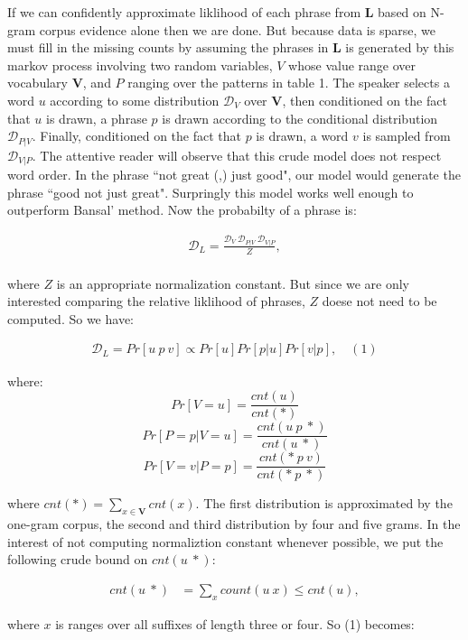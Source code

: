 If we can confidently approximate liklihood of each phrase from $\mathbf{L}$ based on N-gram corpus evidence alone then we are done. But because data is sparse, we must fill in the missing counts by assuming the phrases in $\mathbf{L}$ is generated by this markov process involving two random variables, $V$ whose value range over vocabulary $\mathbf{V}$, and $P$ ranging over the patterns in table 1. The speaker selects a word $u$ according to some distribution $\mathcal{D}_{V}$ over $\mathbf{V}$,  then conditioned on the fact that $u$ is drawn, a phrase $p$ is drawn according to the conditional distribution $\mathcal{D}_{P|V}$. Finally, conditioned on the fact that $p$ is drawn, a word $v$ is sampled from $\mathcal{D}_{V|P}$. The attentive reader will observe that this crude model does not respect word order. In the phrase ``not great (,) just good", our model would generate the phrase ``good not just great". Surpringly this model works well enough to outperform Bansal' method. Now the probabilty of a phrase is:

\begin{align*}
\mathcal{D}_L = \frac{\mathcal{D}_{V} \: \mathcal{D}_{P|V} \: \mathcal{D}_{V|P}}{Z},\\
\end{align*}

where $Z$ is an appropriate normalization constant. But since we are only interested comparing the relative liklihood of phrases, $Z$ doese not need to be computed. So we have:

\begin{align*}
\mathcal{D}_L = Pr[u \: p \: v] \propto Pr[u] Pr[p | u] Pr[v | p], \quad (1)
\end{align*}

where:
\[Pr[V = u]               = \frac{cnt(u)}{cnt(*)}\]
\[Pr[P = p | V = u]  = \frac{cnt(u \: p \: *)}{cnt(u \: *)}\]
\[Pr[V = v | P = p]  = \frac{cnt(* \: p \: v)}{cnt(* \: p \: *)}\]

where $cnt(*) = \sum_{x \in \mathbf{V}} cnt(x)$. The first distribution is approximated by the one-gram corpus, the second and third distribution by four and five grams. In the interest of not computing normaliztion constant whenever possible, we put the following crude bound on $cnt(u \: *)$:

\begin{align*}
cnt(u \: *) &= \sum_{x} count(u \: x) \leq cnt(u),
\end{align*}

where $x$ is ranges over all suffixes of length three or four. So (1) becomes:\\

